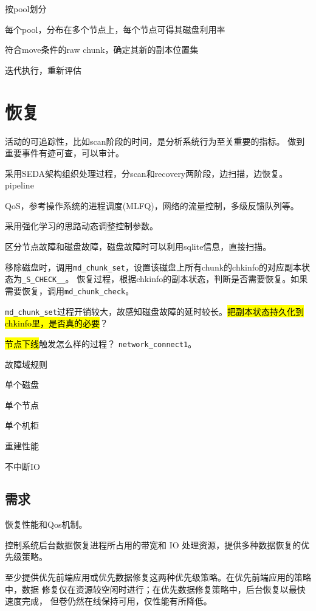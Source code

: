 \begin{enumbox}
\item 按pool划分
\item 每个pool，分布在多个节点上，每个节点可得其磁盘利用率
\item 符合move条件的raw chunk，确定其新的副本位置集
\item 迭代执行，重新评估
\end{enumbox}

\section{恢复}

活动的可追踪性，比如scan阶段的时间，是分析系统行为至关重要的指标。
做到重要事件有迹可查，可以审计。

采用SEDA架构组织处理过程，分scan和recovery两阶段，边扫描，边恢复。
pipeline

QoS，参考操作系统的进程调度(MLFQ)，网络的流量控制，多级反馈队列等。

采用强化学习的思路动态调整控制参数。

区分节点故障和磁盘故障，磁盘故障时可以利用sqlite信息，直接扫描。

移除磁盘时，调用\verb|md_chunk_set|，设置该磁盘上所有chunk的chkinfo的对应副本状态为\verb|_S_CHECK__|。
恢复过程，根据chkinfo的副本状态，判断是否需要恢复。如果需要恢复，调用\verb|md_chunk_check|。

\verb|md_chunk_set|过程开销较大，故感知磁盘故障的延时较长。\hl{把副本状态持久化到chkinfo里，是否真的必要}？

\hl{节点下线}触发怎么样的过程？ \verb|network_connect1|。

故障域规则

单个磁盘

单个节点

单个机柜

重建性能

不中断IO

\subsection{需求}

恢复性能和Qos机制。

控制系统后台数据恢复进程所占用的带宽和 IO 处理资源，提供多种数据恢复的优先级策略。

至少提供优先前端应用或优先数据修复这两种优先级策略。在优先前端应用的策略中，数据
修复仅在资源较空闲时进行；在优先数据修复策略中，后台恢复以最快速度完成，
但卷仍然在线保持可用，仅性能有所降低。

